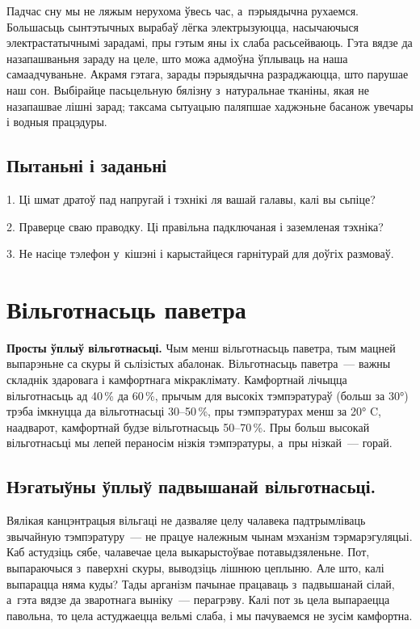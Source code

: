 Падчас сну мы не ляжым нерухома ўвесь час, а~пэрыядычна рухаемся. Большасьць сынтэтычных вырабаў лёгка электрызуюцца, насычаючыся электрастатычнымі зарадамі, пры гэтым яны іх слаба расьсейваюць. Гэта вядзе да назапашваньня зараду на целе, што можа адмоўна ўплываць на наша самаадчуваньне. Акрамя гэтага, зарады пэрыядычна разраджаюцца, што парушае наш сон. Выбірайце пасьцельную бялізну з~натуральнае тканіны, якая не назапашвае лішні зарад; таксама сытуацыю паляпшае хаджэньне басанож увечары і водныя працэдуры.

\subsection*{Пытаньні і заданьні}

1. Ці шмат дратоў пад напругай і тэхнікі ля вашай галавы, калі вы сьпіце?

2. Праверце сваю праводку. Ці правільна падключаная і заземленая тэхніка?

3. Не насіце тэлефон у~кішэні і карыстайцеся гарнітурай для доўгіх размоваў.


\section{Вільготнасьць паветра}

\textbf{Просты ўплыў вільготнасьці.} Чым менш вільготнасьць паветра, тым мацней выпарэньне са скуры й сьлізістых абалонак.
Вільготнасьць паветра~--- важны складнік здаровага і камфортнага мікраклімату. Камфортнай лічыцца вільготнасьць ад 40\,\% да 60\,\%, прычым для высокіх тэмпэратураў (больш за 30°) трэба імкнуцца да вільготнасьці 30--50\,\%, пры тэмпэратурах менш за 20° C, наадварот, камфортнай будзе вільготнасьць 50--70\,\%. Пры больш высокай вільготнасьці мы лепей пераносім нізкія тэмпэратуры, а~пры нізкай~--- горай.

\subsection*{Нэгатыўны ўплыў падвышанай вільготнасьці.}

Вялікая канцэнтрацыя вільгаці не дазваляе целу чалавека падтрымліваць звычайную тэмпэратуру~--- не працуе належным чынам мэханізм тэрмарэгуляцыі. Каб астудзіць сябе, чалавечае цела выкарыстоўвае потавыдзяленьне. Пот, выпараючыся з~паверхні скуры, выводзіць лішнюю цеплыню. Але што, калі выпарацца няма куды? Тады арганізм пачынае працаваць з~падвышанай сілай, а~гэта вядзе да зваротнага выніку~--- перагрэву. Калі пот зь цела выпараецца павольна, то цела астуджаецца вельмі слаба, і мы пачуваемся не зусім камфортна.

